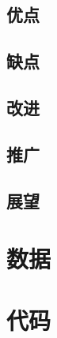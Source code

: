 \documentclass{ctexart}
\newcounter{sub}
\begin{document}
\subsection{优点}%
\label{sub:优点}

\subsection{缺点}%
\label{sub:缺点}

\subsection{改进}%
\label{sub:改进}

\subsection{推广}%
\label{sub:推广}

\subsection{展望}%
\label{sub:展望}

\newpage



%


\renewcommand{\thesection}{\Alph{section}~}

\appendix

\section{数据}%
\label{sec:数据}

\section{代码}%
\label{sec:代码}


\printindex
\end{document}

